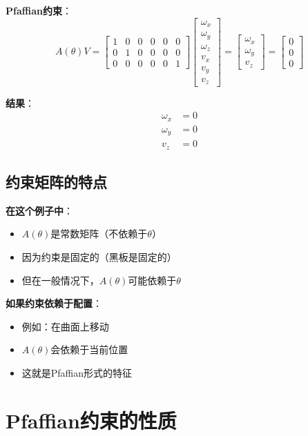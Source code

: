 \documentclass[12pt,a4paper]{article}
\begin{document}
\textbf{Pfaffian约束}：
\begin{equation}
A(\theta)V = \begin{bmatrix}
1 & 0 & 0 & 0 & 0 & 0 \\
0 & 1 & 0 & 0 & 0 & 0 \\
0 & 0 & 0 & 0 & 0 & 1
\end{bmatrix} \begin{bmatrix} \omega_x \\ \omega_y \\ \omega_z \\ v_x \\ v_y \\ v_z \end{bmatrix} = \begin{bmatrix} \omega_x \\ \omega_y \\ v_z \end{bmatrix} = \begin{bmatrix} 0 \\ 0 \\ 0 \end{bmatrix}
\end{equation}

\textbf{结果}：
\begin{align}
\omega_x &= 0 \\
\omega_y &= 0 \\
v_z &= 0
\end{align}

\subsection{约束矩阵的特点}

\textbf{在这个例子中}：
\begin{itemize}
\item $A(\theta)$是常数矩阵（不依赖于$\theta$）
\item 因为约束是固定的（黑板是固定的）
\item 但在一般情况下，$A(\theta)$可能依赖于$\theta$
\end{itemize}

\textbf{如果约束依赖于配置}：
\begin{itemize}
\item 例如：在曲面上移动
\item $A(\theta)$会依赖于当前位置
\item 这就是Pfaffian形式的特征
\end{itemize}

\section{Pfaffian约束的性质}
\end{document}
